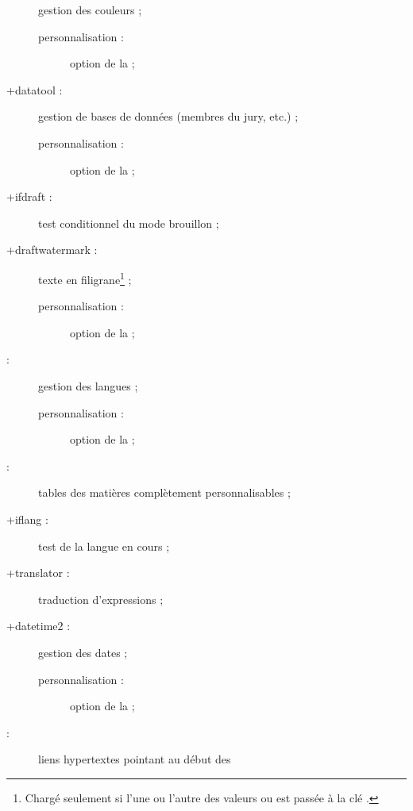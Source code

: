 \begin{description}
  gestion des couleurs ;
  \begin{description}
  \item[personnalisation :] option  de la \yatCl{} ;
  \end{description}
\item[\package*+{datatool} :] gestion de bases de données (membres du jury,
  etc.) ;
  \begin{description}
  \item[personnalisation :] option  de la \yatCl{} ;
  \end{description}
\item[\package*+{ifdraft} :] test conditionnel du mode brouillon ;
\item[\package+{draftwatermark} :] texte en
  filigrane\footnote{Chargé seulement si l'une ou l'autre des
    valeurs  ou  est passée à la clé
    .} ;
  \begin{description}
  \item[personnalisation :] option  de la \yatCl{} ;
  \end{description}
\item[\package{babel} :] gestion des langues ;
  \begin{description}
  \item[personnalisation :] option  de la \yatCl{} ;
  \end{description}
\item[\package{etoc} :] tables des matières complètement personnalisables ;
\item[\package*+{iflang} :] test de la langue en cours ;
\item[\package*+{translator} :] traduction d'expressions ;
\item[\package+{datetime2} :] %
  gestion des dates ;
  \begin{description}
  \item[personnalisation :] option  de la \yatCl{} ;
  \end{description}
\item[\package{hypcap} :] liens hypertextes pointant au début des

\end{description}
